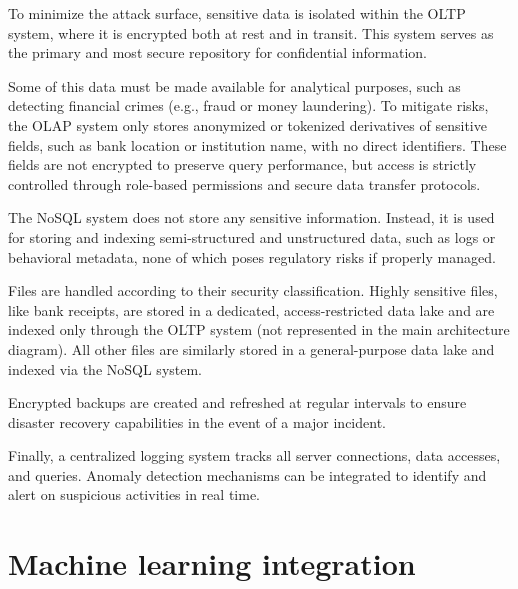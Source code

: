 \documentclass[11pt,a4paper,computermodern]{article}
\begin{document}
To minimize the attack surface, sensitive data is isolated within the OLTP system, where it is encrypted both at rest and in transit. This system serves as the primary and most secure repository for confidential information.

Some of this data must be made available for analytical purposes, such as detecting financial crimes (e.g., fraud or money laundering). To mitigate risks, the OLAP system only stores anonymized or tokenized derivatives of sensitive fields, such as bank location or institution name, with no direct identifiers. These fields are not encrypted to preserve query performance, but access is strictly controlled through role-based permissions and secure data transfer protocols.

The NoSQL system does not store any sensitive information. Instead, it is used for storing and indexing semi-structured and unstructured data, such as logs or behavioral metadata, none of which poses regulatory risks if properly managed.

Files are handled according to their security classification. Highly sensitive files, like bank receipts, are stored in a dedicated, access-restricted data lake and are indexed only through the OLTP system (not represented in the main architecture diagram). All other files are similarly stored in a general-purpose data lake and indexed via the NoSQL system.

Encrypted backups are created and refreshed at regular intervals to ensure disaster recovery capabilities in the event of a major incident.

Finally, a centralized logging system tracks all server connections, data accesses, and queries. Anomaly detection mechanisms can be integrated to identify and alert on suspicious activities in real time.


\section*{Machine learning integration}
\end{document}
